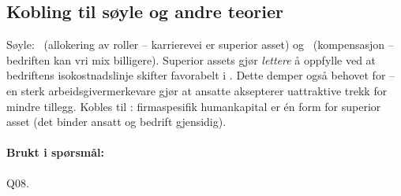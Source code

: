 \subsection*{Kobling til søyle og andre teorier}
Søyle: \SOne\ (allokering av roller -- karrierevei er superior asset) og \SThree\ (kompensasjon -- bedriften kan vri mix billigere). Superior assets gjør  \emph{lettere} å oppfylle ved at bedriftens isokostnadslinje skifter favorabelt i . Dette demper også behovet for  -- en sterk arbeidsgivermerkevare gjør at ansatte aksepterer uattraktive trekk for mindre tillegg. Kobles til : firmaspesifik humankapital er én form for superior asset (det binder ansatt og bedrift gjensidig).

\paragraph{Brukt i spørsmål:} Q08.
